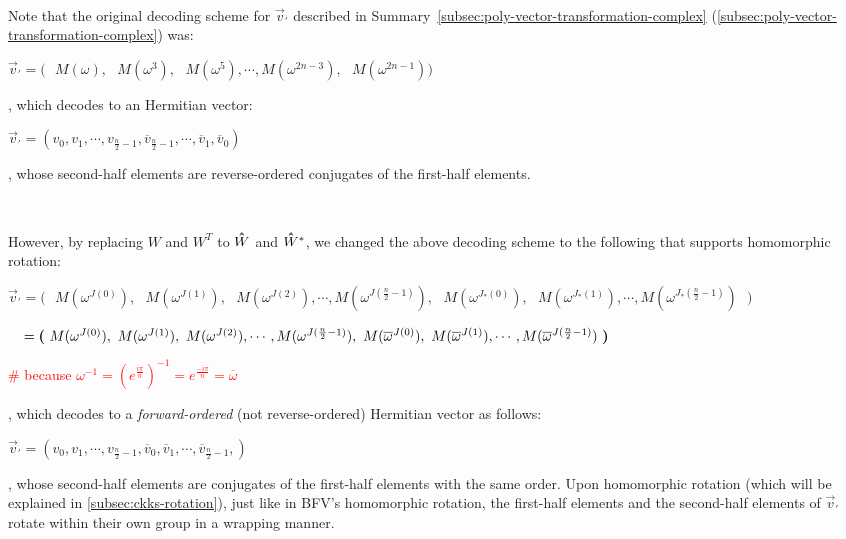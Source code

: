 $ $


 Note that the original decoding scheme for $\vec{v}_{'}$ described in Summary~\ref*{subsec:poly-vector-transformation-complex} (\autoref{subsec:poly-vector-transformation-complex}) was: 

$\vec{v}_{'} = \bm{(} \text{ } M(\omega), \text{ } M(\omega^3), \text{ } M(\omega^5), \cdots, M(\omega^{2n-3}), \text{ } M(\omega^{2n-1}) \bm{)}$

, which decodes to an Hermitian vector:

$\vec{v}_{'} = (v_0, v_1, \cdots, v_{\frac{n}{2} - 1}, \overline v_{\frac{n}{2} - 1}, \cdots, \overline v_1, \overline v_0 )$

, whose second-half elements are reverse-ordered conjugates of the first-half elements. 

$ $

However, by replacing $W$ and $W^T$ to $\hathat W$ and $\hathat W^*$, we changed the above decoding scheme to the following that supports homomorphic rotation:


$\vec{v}_{'} =  \bm{(} \text{ } 
M(\omega^{J(0)}), \text{ } M(\omega^{J(1)}), \text{ } M(\omega^{J(2)}), \cdots,  M(\omega^{J(\frac{n}{2}-1)}), \text{ } M(\omega^{J_*(0)}), \text{ } M(\omega^{J_*(1)}), \cdots,  M(\omega^{J_*(\frac{n}{2}-1)}) \text{ } \bm{)}$

$\textcolor{white}{\vec{v}_{'}} =  \bm{(} \text{ } 
M(\omega^{J(0)}), \text{ } M(\omega^{J(1)}), \text{ } M(\omega^{J(2)}), \cdots,  M(\omega^{J(\frac{n}{2}-1)}), \text{ } M(\overline\omega^{J(0)}), \text{ } M(\overline\omega^{J(1)}), \cdots,  M(\overline\omega^{J(\frac{n}{2}-1)}) \text{ } \bm{)}$ 

\textcolor{red}{ \# because $\omega^{-1} = (e^{\frac{i\pi}{n}})^{-1} = e^{\frac{-i\pi}{n}} = \overline\omega$}

, which decodes to a \textit{forward-ordered} (not reverse-ordered) Hermitian vector as follows:

$\vec{v}_{'} = (v_0, v_1, \cdots, v_{\frac{n}{2} - 1}, \overline v_0, \overline v_1, \cdots, \overline v_{\frac{n}{2} - 1}, )$

, whose second-half elements are conjugates of the first-half elements with the same order. Upon homomorphic rotation (which will be explained in \autoref{subsec:ckks-rotation}), just like in BFV's homomorphic rotation, the first-half elements and the second-half elements of $\vec{v}_{'}$ rotate within their own group in a wrapping manner. 



